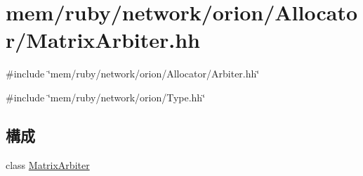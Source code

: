\hypertarget{MatrixArbiter_8hh}{
\section{mem/ruby/network/orion/Allocator/MatrixArbiter.hh}
\label{MatrixArbiter_8hh}
}
{\ttfamily \#include \char`\"{}mem/ruby/network/orion/Allocator/Arbiter.hh\char`\"{}}\par
{\ttfamily \#include \char`\"{}mem/ruby/network/orion/Type.hh\char`\"{}}\par
\subsection*{構成}
\begin{DoxyCompactItemize}
\item 
class \hyperlink{classMatrixArbiter}{MatrixArbiter}
\end{DoxyCompactItemize}
